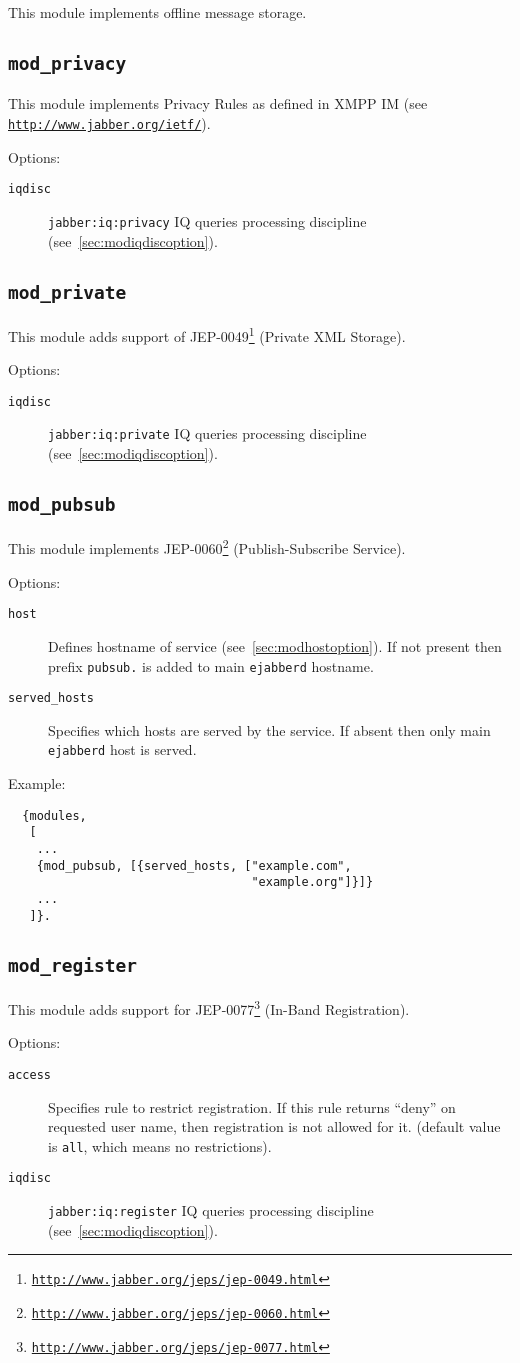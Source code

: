\documentclass[a4paper,10pt]{article}
\newcommand{\bracehack}{\def\{{\char"7B}\def\}{\char"7D}}
\newcommand{\ns}[1]{\texttt{#1}}
\newcommand{\jid}[1]{\texttt{#1}}
\newcommand{\term}[1]{\texttt{#1}}
\newcommand{\ejabberd}{\texttt{ejabberd}}
\newcommand{\module}[1]{\texttt{#1}}
\newcommand{\modprivacy}{\module{mod\_privacy}}
\newcommand{\modprivate}{\module{mod\_private}}
\newcommand{\modpubsub}{\module{mod\_pubsub}}
\newcommand{\modregister}{\module{mod\_register}}
\newcommand{\titem}[1]{\item[\bracehack\texttt{#1}]}
\gdef\ahrefurl#1{\href{#1}{\texttt{#1}}}
\gdef\footahref#1#2{#2\footnote{\href{#1}{\texttt{#1}}}}
\newcommand{\tjepref}[2]{\footahref{http://www.jabber.org/jeps/jep-#1.html}{#2}}
\newcommand{\jepref}[1]{\tjepref{#1}{JEP-#1}}
\newcommand{\iqdiscitem}[1]{\titem{iqdisc} #1 IQ queries processing
discipline (see~\ref{sec:modiqdiscoption}).}
\newcommand{\hostitem}[1]{\titem{host} Defines hostname of service
(see~\ref{sec:modhostoption}). If not present
then prefix \jid{#1.} is added to main \ejabberd{} hostname.}
\begin{document}
This module implements offline message storage.


\subsection{\modprivacy{}}
\label{sec:modprivacy}

This module implements Privacy Rules as defined in XMPP IM
(see \ahrefurl{http://www.jabber.org/ietf/}).

Options:
\begin{description}
\iqdiscitem{\ns{jabber:iq:privacy}}
\end{description}


\subsection{\modprivate{}}
\label{sec:modprivate}

This module adds support of \jepref{0049} (Private XML Storage).

Options:
\begin{description}
\iqdiscitem{\ns{jabber:iq:private}}
\end{description}


\subsection{\modpubsub{}}
\label{sec:modpubsub}

This module implements \jepref{0060} (Publish-Subscribe Service).

Options:
\begin{description}
\hostitem{pubsub}
\titem{served\_hosts} Specifies which hosts are served by the service.
If absent then only main \ejabberd{} host is served.
\end{description}

Example:
\begin{verbatim}
  {modules,
   [
    ...
    {mod_pubsub, [{served_hosts, ["example.com",
                                  "example.org"]}]}
    ...
   ]}.
\end{verbatim}


\subsection{\modregister{}}
\label{sec:modregister}

This module adds support for \jepref{0077} (In-Band Registration).

Options:
\begin{description}
\titem{access} Specifies rule to restrict registration.
If this rule returns ``deny'' on requested user name, then
registration is not allowed for it. (default value is \term{all}, which means
no restrictions).
\iqdiscitem{\ns{jabber:iq:register}}
\end{description}
\end{document}
